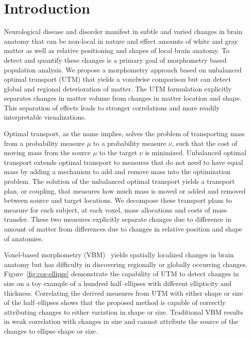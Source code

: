 \documentclass{llncs}
\begin{document}
\section{Introduction}
Neurological disease and disorder manifest in subtle and varied changes in
brain anatomy that can be non-local in nature and effect amounts of white and
gray matter as well as relative positioning and shapes of local brain anatomy.
To detect and quantify these changes is a primary goal of morphometry based
population analysis. We propose a morphometry approach based on unbalanced
optimal transport (UTM) that yields a voxelwise comparison but can detect
global and regional deterioration of matter. The UTM formulation explicitly
separates changes in matter volume from changes in matter location and shape.
This separation of effects leads to stronger correlations and more readily
interpretable visualizations. 

Optimal transport, as the name implies, solves the problem of transporting mass
from a probability measure $\mu$ to a probability measure $\nu$, such that the
cost of moving mass from the source $\mu$ to the target $\nu$ is minimized.
Unbalanced optimal transport extends optimal transport to measures that do not
need to have equal mass by adding a mechanism to add and remove mass
into the optimization problem. The solution of the unbalanced optimal transport
yields a transport plan, or coupling, that measures how much mass is moved or
added and removed between source and target locations. We decompose these
transport plans to measure for each subject, at each voxel, mass allocations
and costs of mass transfer. These two measures explicitly separate changes due
to difference in amount of matter from differences due to changes in relative
position and shape of anatomies. 

Voxel-based morphometry (VBM)~\cite{ashburner1998identifying} yields spatially
localized changes in brain anatomy but has difficulty in discovering regionally
or globally occurring changes. Figure~\ref{fig:cor-ellipse} demonstrate the
capability of UTM to detect changes in size on a toy example of a hundred
half--ellipses with different ellipticity and thickness.  Correlating the
derived measures from UTM with either shape or size of the half--ellipses shows
that the proposed method is capable of correctly attributing changes to either
variation in shape or size.  Traditional VBM  results in weak correlation with
changes in size and cannot attribute the source of the changes to ellipse shape
or size.
\end{document}
